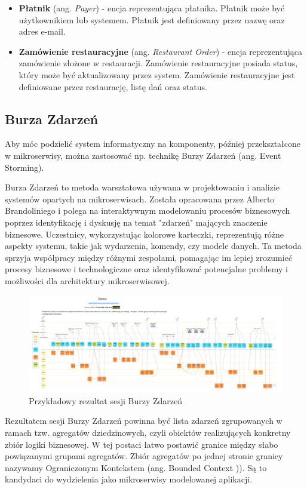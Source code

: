 \begin{itemize}
    \item \textbf{Płatnik} (ang. \textit{Payer}) - encja reprezentująca płatnika. Płatnik może być użytkownikiem lub systemem. Płatnik jest definiowany przez nazwę oraz adres e-mail.
    \item \textbf{Zamówienie restauracyjne} (ang. \textit{Restaurant Order}) - encja reprezentująca zamówienie złożone w restauracji. Zamówienie restauracyjne posiada status, który może być aktualizowany przez system. Zamówienie restauracyjne jest definiowane przez restaurację, listę dań oraz status.

\end{itemize}

\subsection{Burza Zdarzeń}

Aby móc podzielić system informatyczny na komponenty, później przekształcone w mikroserwisy, można zastosować np. technikę Burzy Zdarzeń (ang. Event Storming).

Burza Zdarzeń to metoda warsztatowa używana w projektowaniu i analizie systemów opartych na mikroserwisach. Została opracowana przez Alberto Brandoliniego i polega na interaktywnym modelowaniu procesów biznesowych poprzez identyfikację i dyskusję na temat "zdarzeń" mających znaczenie biznesowe. Uczestnicy, wykorzystując kolorowe karteczki, reprezentują różne aspekty systemu, takie jak wydarzenia, komendy, czy modele danych. Ta metoda sprzyja współpracy między różnymi zespołami, pomagając im lepiej zrozumieć procesy biznesowe i technologiczne oraz identyfikować potencjalne problemy i możliwości dla architektury mikroserwisowej.

\begin{figure}[!h]
    \centering \includegraphics[width=0.8\linewidth]{event_storming.png}
    \caption{Przykładowy rezultat sesji Burzy Zdarzeń \cite{event_storming_rys}}
\end{figure}


Rezultatem sesji Burzy Zdarzeń powinna być lista zdarzeń zgrupowanych w ramach tzw. agregatów dziedzinowych, czyli obiektów realizujących konkretny zbiór logiki biznesowej. W tej postaci łatwo postawić granice między słabo powiązanymi grupami agregatów. Zbiór agregatów po jednej stronie granicy nazywamy Ograniczonym Kontekstem (ang. Bounded Context \cite{boundedcontext})). Są to kandydaci do wydzielenia jako mikroserwisy modelowanej aplikacji.

